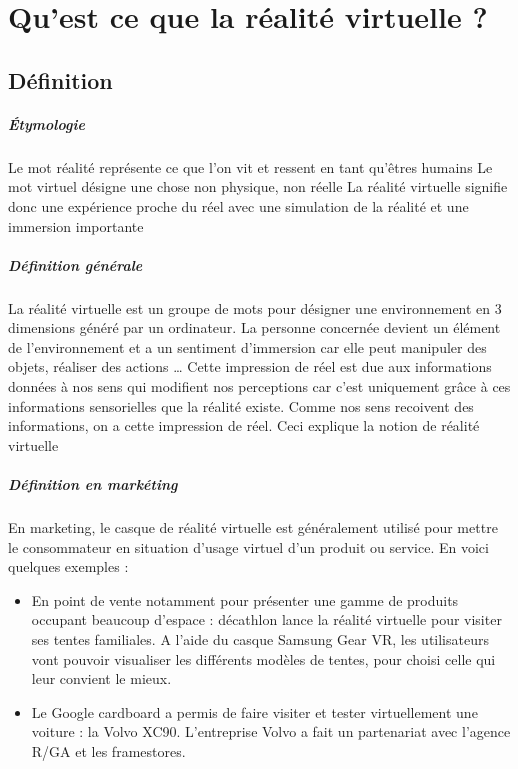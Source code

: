 \documentclass[12pt, a4paper]{report}
\begin{document}
\chapter[Réalité virtuelle]{Qu'est ce que la réalité virtuelle ?}

\section{Définition}

\paragraph{\'{E}tymologie}
Le mot réalité représente ce que l'on vit et ressent en tant qu'êtres humains
Le mot virtuel désigne une chose non physique, non réelle
La réalité virtuelle signifie donc  une expérience proche du réel avec une simulation de la réalité et une immersion importante

\paragraph{Définition générale}
La réalité virtuelle est un groupe de mots pour désigner une environnement en 3 dimensions généré par un ordinateur. La personne concernée devient un élément de l'environnement et a un sentiment d'immersion car elle peut manipuler des objets, réaliser des actions \ldots{}
Cette impression de réel est due aux informations données à nos sens qui modifient nos perceptions car c'est uniquement grâce à ces informations sensorielles que la réalité existe. Comme nos sens recoivent des informations, on a cette impression de réel. Ceci explique la notion de réalité virtuelle

\paragraph{Définition en markéting}
En marketing, le casque de réalité virtuelle est généralement utilisé pour mettre le consommateur en situation d'usage virtuel d'un produit ou service. En voici quelques exemples :\\
\begin{itemize}
\item En point de vente notamment pour présenter une gamme de produits occupant beaucoup d'espace : décathlon lance la réalité virtuelle pour visiter ses tentes familiales. A l'aide du casque Samsung Gear VR, les utilisateurs vont pouvoir visualiser les différents modèles de tentes, pour choisi celle qui leur convient le mieux.

\item Le Google cardboard a permis de faire visiter et tester virtuellement une voiture : la Volvo XC90. L'entreprise Volvo a fait un partenariat avec l'agence R/GA et les framestores.
\end{itemize}
\end{document}
